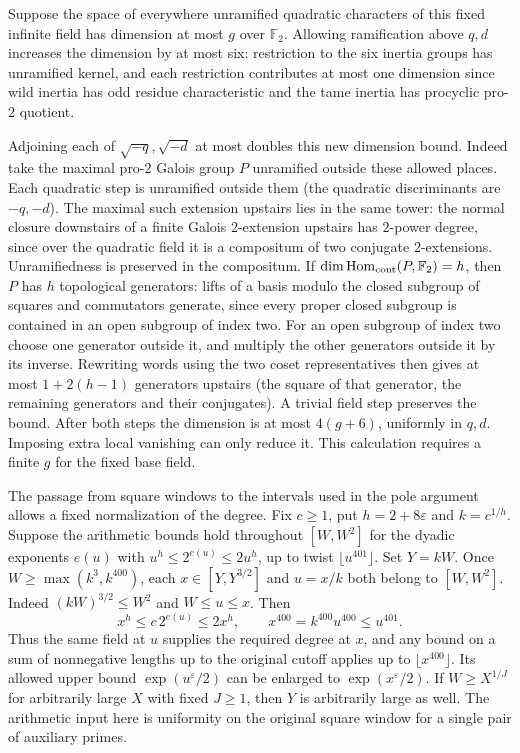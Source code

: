 \documentclass[11pt]{amsart}
\theoremstyle{definition}
\theoremstyle{remark}
\begin{document}
Suppose the space of everywhere unramified quadratic characters
of this fixed infinite field has dimension at most $g$ over
$\mathbb F_2$. Allowing ramification above $q,d$ increases the
dimension by at most six: restriction to the six inertia groups
has unramified kernel, and each restriction contributes at most
one dimension since wild inertia has odd residue characteristic
and the tame inertia has procyclic pro-$2$ quotient.

Adjoining each of $\sqrt{-q},\sqrt{-d}$ at most doubles this
new dimension bound. Indeed take the maximal pro-$2$ Galois group
$P$ unramified outside these allowed places. Each quadratic step is
unramified outside them (the quadratic discriminants are $-q,-d$).
The maximal such extension upstairs lies in the same tower: the
normal closure downstairs of a finite Galois $2$-extension upstairs
has $2$-power degree, since over the quadratic field it is a compositum
of two conjugate $2$-extensions. Unramifiedness is preserved in the
compositum. If $\dim\operatorname{Hom}_{\rm cont}(P,\mathbb F_2)=h$,
then $P$ has $h$ topological generators: lifts of a basis modulo the
closed subgroup of squares and commutators generate, since every
proper closed subgroup is contained in an open subgroup of index two.
For an open subgroup of index two choose one generator outside it,
and multiply the other generators outside it by its inverse.
Rewriting words using the two coset representatives then gives at
most $1+2(h-1)$ generators upstairs (the square of that generator,
the remaining generators and their conjugates). A trivial field step
preserves the bound. After both steps the dimension is at most
$4(g+6)$, uniformly in $q,d$. Imposing extra local vanishing can
only reduce it. This calculation requires a finite $g$ for the fixed
base field.

The passage from square windows to the intervals used in the pole
argument allows a fixed normalization of the degree. Fix $c\ge1$, put
$h=2+8\varepsilon$ and $k=c^{1/h}$. Suppose the arithmetic bounds
hold throughout $[W,W^2]$ for the dyadic exponents $e(u)$ with
$u^h\le2^{e(u)}\le2u^h$, up to twist $\lfloor u^{401}\rfloor$.
Set $Y=kW$. Once $W\ge\max(k^3,k^{400})$, each
$x\in[Y,Y^{3/2}]$ and $u=x/k$ both belong to $[W,W^2]$.
Indeed $(kW)^{3/2}\le W^2$ and $W\le u\le x$. Then
\[
 x^h\le c\,2^{e(u)}\le2x^h,\qquad
 x^{400}=k^{400}u^{400}\le u^{401}.
\]
Thus the same field at $u$ supplies the required degree at $x$,
and any bound on a sum of nonnegative lengths up to the original
cutoff applies up to $\lfloor x^{400}\rfloor$. Its allowed upper
bound $\exp(u^\varepsilon/2)$ can be enlarged to
$\exp(x^\varepsilon/2)$. If $W\ge X^{1/J}$ for arbitrarily large
$X$ with fixed $J\ge1$, then $Y$ is arbitrarily large as well.
The arithmetic input here is uniformity on the original square
window for a single pair of auxiliary primes.
\end{document}
